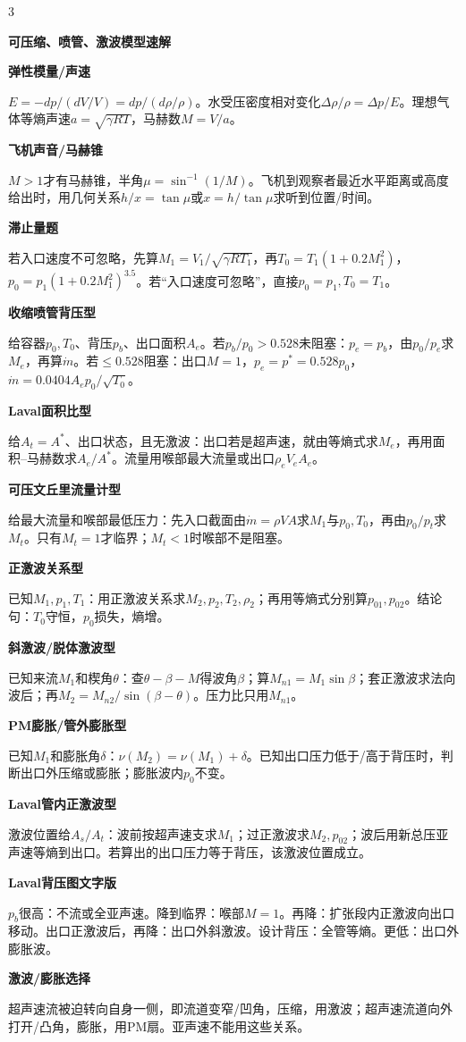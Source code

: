 \documentclass[a4paper]{article}
\newcommand{\qt}[1]{\vspace{0.25pt}\colorbox{Q}{\parbox{\dimexpr\linewidth-2\fboxsep}{\color{white}\bfseries #1}}\par}
\newcommand{\sect}[1]{\qt{#1}}
\begin{document}
\begin{multicols}{3}
{\sect{可压缩、喷管、激波模型速解}
\sect{弹性模量/声速}
$E=-dp/(dV/V)=dp/(d\rho/\rho)$。水受压密度相对变化$\Delta\rho/\rho=\Delta p/E$。理想气体等熵声速$a=\sqrt{\gamma RT}$，马赫数$M=V/a$。
\sect{飞机声音/马赫锥}
$M>1$才有马赫锥，半角$\mu=\sin^{-1}(1/M)$。飞机到观察者最近水平距离或高度给出时，用几何关系$h/x=\tan\mu$或$x=h/\tan\mu$求听到位置/时间。
\sect{滞止量题}
若入口速度不可忽略，先算$M_1=V_1/\sqrt{\gamma RT_1}$，再$T_0=T_1(1+0.2M_1^2)$，$p_0=p_1(1+0.2M_1^2)^{3.5}$。若“入口速度可忽略”，直接$p_0=p_1,T_0=T_1$。
\sect{收缩喷管背压型}
给容器$p_0,T_0$、背压$p_b$、出口面积$A_e$。若$p_b/p_0>0.528$未阻塞：$p_e=p_b$，由$p_0/p_e$求$M_e$，再算$\dot m$。若$\le0.528$阻塞：出口$M=1$，$p_e=p^*=0.528p_0$，$\dot m=0.0404A_ep_0/\sqrt{T_0}$。
\sect{Laval面积比型}
给$A_t=A^*$、出口状态，且无激波：出口若是超声速，就由等熵式求$M_e$，再用面积--马赫数求$A_e/A^*$。流量用喉部最大流量或出口$\rho_eV_eA_e$。
\sect{可压文丘里流量计型}
给最大流量和喉部最低压力：先入口截面由$\dot m=\rho VA$求$M_1$与$p_0,T_0$，再由$p_0/p_t$求$M_t$。只有$M_t=1$才临界；$M_t<1$时喉部不是阻塞。
\sect{正激波关系型}
已知$M_1,p_1,T_1$：用正激波关系求$M_2,p_2,T_2,\rho_2$；再用等熵式分别算$p_{01},p_{02}$。结论句：$T_0$守恒，$p_0$损失，熵增。
\sect{斜激波/脱体激波型}
已知来流$M_1$和楔角$\theta$：查$\theta-\beta-M$得波角$\beta$；算$M_{n1}=M_1\sin\beta$；套正激波求法向波后；再$M_2=M_{n2}/\sin(\beta-\theta)$。压力比只用$M_{n1}$。
\sect{PM膨胀/管外膨胀型}
已知$M_1$和膨胀角$\delta$：$\nu(M_2)=\nu(M_1)+\delta$。已知出口压力低于/高于背压时，判断出口外压缩或膨胀；膨胀波内$p_0$不变。
\sect{Laval管内正激波型}
激波位置给$A_s/A_t$：波前按超声速支求$M_1$；过正激波求$M_2,p_{02}$；波后用新总压亚声速等熵到出口。若算出的出口压力等于背压，该激波位置成立。
\sect{Laval背压图文字版}
$p_b$很高：不流或全亚声速。降到临界：喉部$M=1$。再降：扩张段内正激波向出口移动。出口正激波后，再降：出口外斜激波。设计背压：全管等熵。更低：出口外膨胀波。
\sect{激波/膨胀选择}
超声速流被迫转向自身一侧，即流道变窄/凹角，压缩，用激波；超声速流道向外打开/凸角，膨胀，用PM扇。亚声速不能用这些关系。

}
\end{multicols}
\end{document}

